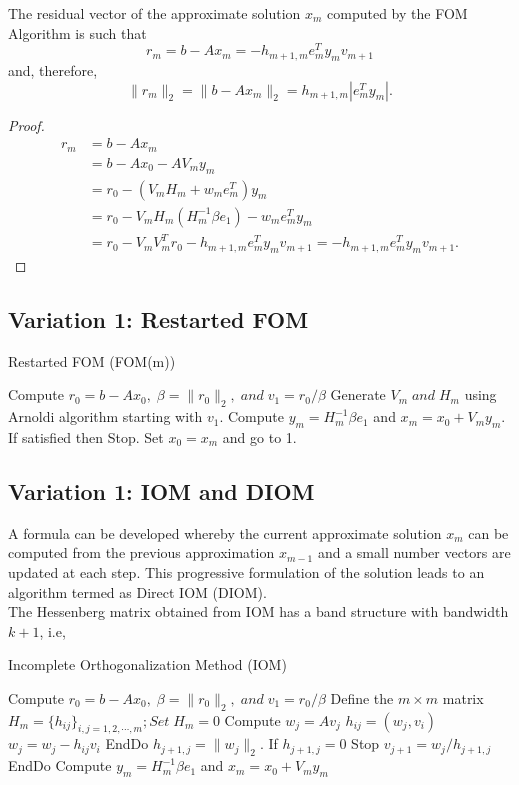 \documentclass[10pt,a4paper]{article}
\begin{document}
\begin{prop}
The residual vector of the approximate solution $x_m$ computed by the FOM Algorithm is such that 
$$r_m=b-Ax_m=-h_{m+1,m}e^T_my_mv_{m+1}$$
and, therefore,
$$\|r_m\|_2=\|b-Ax_m\|_2=h_{m+1,m}|e^T_my_m|.$$

\begin{proof}
\begin{align*}
r_m&=b-Ax_m \\
&= b-Ax_0-AV_my_m \\
&= r_0 - (V_mH_m+w_me^T_m)y_m \\
&= r_0 - V_mH_m(H^{-1}_m\beta e_1) - w_me^T_my_m \\
&= r_0 - V_mV^T_mr_0 - h_{m+1,m}e^T_my_mv_{m+1}=-h_{m+1,m}e^T_my_mv_{m+1}.
\end{align*}
\end{proof}
\end{prop}

\subsection{Variation 1: Restarted FOM}

\begin{algorithm}
\caption{Restarted FOM (FOM(m))}
\begin{algorithmic}[1]
\State Compute $r_0=b-Ax_0,\;\beta=\|r_0\|_2,\;and\;v_1=r_0/\beta$
\State Generate $V_m\;and\;H_m$ using Arnoldi algorithm starting with $v_1$.
\State Compute $y_m=H^{-1}_m\beta e_1$ and $x_m=x_0+V_my_m$. If satisfied then Stop.
\State Set $x_0=x_m$ and go to 1.
\end{algorithmic}
\end{algorithm}

\subsection{Variation 1: IOM and DIOM}

A formula can be developed whereby the current approximate solution $x_m$ can be computed from the previous approximation $x_{m-1}$ and a small number vectors are updated at each step. This progressive formulation of the solution leads to an algorithm termed as Direct IOM (DIOM).\\
The Hessenberg matrix obtained from IOM has a band structure with bandwidth $k+1$, i.e,

\begin{algorithm}
\caption{Incomplete Orthogonalization Method (IOM)}
\begin{algorithmic}[1]
\State Compute $r_0=b-Ax_0,\;\beta=\|r_0\|_2,\;and\;v_1=r_0/\beta$
\State Define the $m\times m$ matrix $H_m = \{h_{ij}\}_{i,j=1,2,\cdots,m};Set\;H_m=0$
	\State Compute $w_j = Av_j$
		\State $h_{ij} = (w_j,v_i)$
		\State $w_j = w_j - h_{ij}v_i$
	\EndFor
	\State EndDo
	\State $h_{j+1,j} = \|w_j\|_2$. If $h_{j+1,j}=0$ Stop
	\State $v_{j+1}=w_j/h_{j+1,j}$
\EndFor
\State EndDo
\State Compute $y_m=H^{-1}_m\beta e_1$ and $x_m=x_0+V_my_m$
\end{algorithmic}
\end{algorithm}
\end{document}
